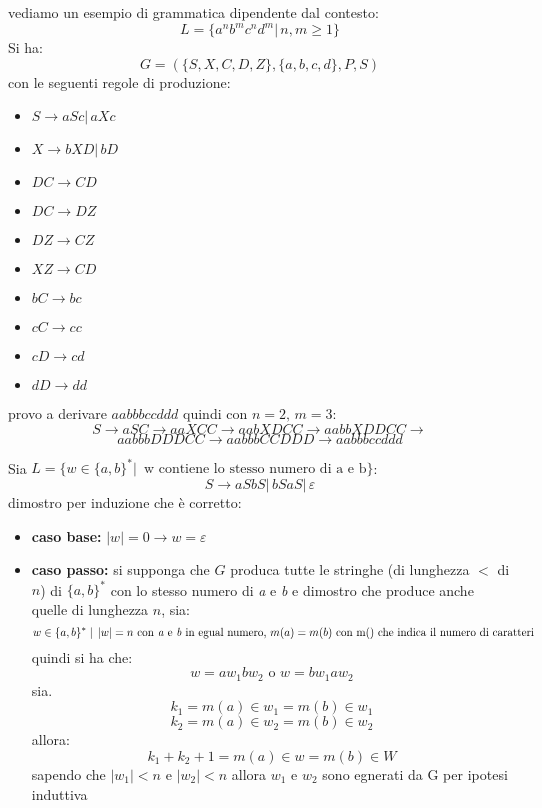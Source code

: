 \documentclass[a4paper,12pt, oneside]{book}
\begin{document}
\newpage
\begin{esempio}
vediamo un esempio di grammatica dipendente dal contesto:
$$L=\{a^nb^mc^nd^m|\, n,m\geq 1\}$$
Si ha:
$$G=(\{S,X,C,D,Z\},\{a,b,c,d\},P,S)$$
con le seguenti regole di produzione:
\begin{itemize}
\item $S\to aSc|\, aXc$
\item $X\to bXD|\, bD$
\item $DC\to CD$
\item $DC\to DZ$
\item $DZ\to CZ$
\item $XZ\to CD$
\item $bC\to bc$
\item $cC\to cc$
\item $cD\to cd$
\item $dD\to dd$
\end{itemize}
provo a derivare $aabbbccddd$ quindi con $n=2,\,m=3$:\\
$$S\to aSC\to aaXCC\to aabXDCC\to aabbXDDCC\to $$
$$aabbbDDDCC\to aabbbCCDDD\to aabbbccddd$$
\end{esempio}
\begin{esempio}
Sia $L=\{w\in\{a,b\}^*|\, \mbox{ w contiene lo stesso numero di a e b}\}$:
$$S\to aSbS|\,bSaS|\, \varepsilon$$
dimostro per induzione che è corretto:
\begin{itemize}
\item \textbf{caso base:} $|w|=0\to w=\varepsilon$
\item \textbf{caso passo:} si supponga che $G$ produca tutte le stringhe (di lunghezza $<$ di $n$) di $\{a,b\}^*$ con lo stesso numero di \textit{a} e \textit{b} e dimostro che produce anche quelle di lunghezza $n$, sia:
$$w\in \{a,b\}^* \mid\, |w|=n \mbox{ con\textit{ a} e \textit{b} in egual numero, }m(a)=m(b) \mbox{ con m() che indica il numero di caratteri}$$
quindi si ha che:
$$w=aw_1bw_2\mbox{ o } w=bw_1aw_2$$
sia.
$$k_1=m(a)\in w_1=m(b)\in w_1$$
$$k_2=m(a)\in w_2=m(b)\in w_2$$
allora:
$$k_1+k_2+1=m(a)\in w= m(b)\in W$$
sapendo che $|w_1|<n$ e $|w_2|<n$ allora $w_1$ e $w_2$ sono egnerati da G per ipotesi induttiva
\end{itemize}
\end{esempio}
\end{document}
